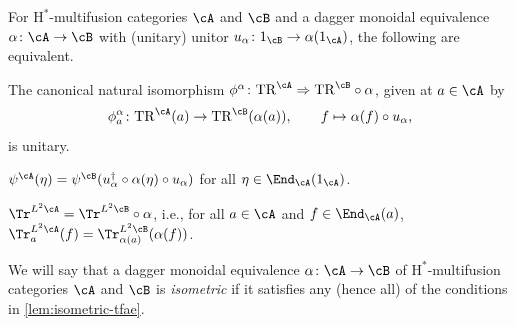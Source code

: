\documentclass[12pt,reqno]{amsart}
\newcounter{alpha}\renewcommand\thealpha{\upshape\Alph{alpha}}
\newcommand{\Hstar}{\ensuremath{\mathrm{H}^{*}}}
\newcommand{\defn}[1]{\emph{#1}}
\begin{document}
\begin{lemma}
\label{lem:isometric-tfae}
For $\Hstar$-multifusion categories $\cA$ and $\cB$ and a dagger monoidal equivalence $\alpha\colon \cA \to \cB$ with (unitary) unitor $u_\alpha\colon 1_\cB \to \alpha(1_\cA)$, the following are equivalent.
\begin{lst}
\item \label{item:phi-unitary} The canonical natural isomorphism $\phi^\alpha\colon \mathrm{TR}^{\cA} \Rightarrow \mathrm{TR}^{\cB}\circ \alpha$, given at $a \in \cA$ by
\[
\phi_a^\alpha\colon \mathrm{TR}^{\cA}(a) \to \mathrm{TR}^{\cB}(\alpha(a)), \qquad f \mapsto \alpha(f)\circ u_\alpha,
\]
is unitary.
\item \label{item:psi-invariance} $\psi^{\cA}(\eta) = \psi^{\cB}(u_\alpha^\dag \circ \alpha(\eta) \circ u_\alpha)$ for all $\eta \in \End_{\cA}(1_\cA)$.
\item \label{item:trace-preserved} $\Tr^{L^2\cA} = \Tr^{L^2\cB}\circ \alpha$, i.e., for all $a \in \cA$ and $f \in \End_{\cA}(a)$, $\Tr^{L^2\cA}_a(f) = \Tr^{L^2\cB}_{\alpha(a)}(\alpha(f))$.
\end{lst}
\end{lemma}

\begin{definition} 
\label{def:HmFC-isometric-equivalence}
We will say that a dagger monoidal equivalence $\alpha\colon \cA\to\cB$ of $\Hstar$-multifusion categories $\cA$ and $\cB$ is \defn{isometric} if it satisfies any (hence all) of the conditions in \cref{lem:isometric-tfae}.
\end{definition}
\end{document}
